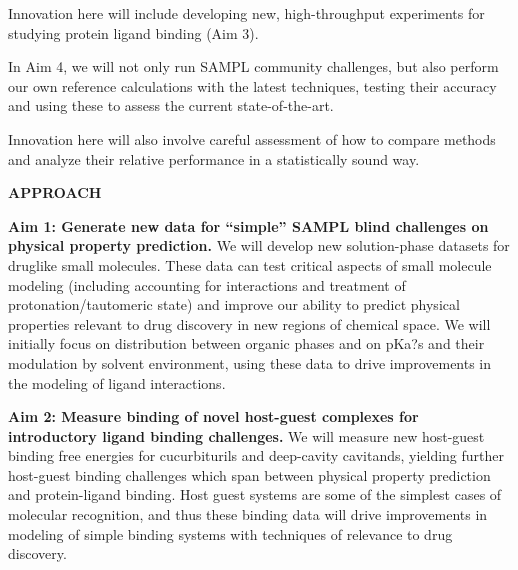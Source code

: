 \documentclass[11pt]{article}
\begin{document}
Innovation here will include developing new, high-throughput experiments for studying protein ligand binding (Aim 3).

In Aim 4, we will not only run SAMPL community challenges, but also perform our own reference calculations with the latest techniques, testing their accuracy and using these to assess the current state-of-the-art.

Innovation here will also involve careful assessment of how to compare methods and analyze their relative performance in a statistically sound way.

{\large \bf APPROACH}


{\bf Aim 1: Generate new data for ``simple'' SAMPL blind challenges on physical property prediction.}
We will develop new solution-phase datasets for druglike small molecules. These data can test critical aspects of small molecule modeling (including accounting for interactions and treatment of protonation/tautomeric state) and improve our ability to predict physical properties relevant to drug discovery in new regions of chemical space. We will initially focus on distribution between organic phases and on pKa?s and their modulation by solvent environment, using these data to drive improvements in the modeling of ligand interactions.


{\bf Aim 2: Measure binding of novel host-guest complexes for introductory ligand binding challenges.}
We will measure new host-guest binding free energies for cucurbiturils and deep-cavity cavitands, yielding further host-guest binding challenges which span between physical property prediction and protein-ligand binding. Host guest systems are some of the simplest cases of molecular recognition, and thus these binding data will drive improvements in modeling of simple binding systems with techniques of relevance to drug discovery.
\end{document}
